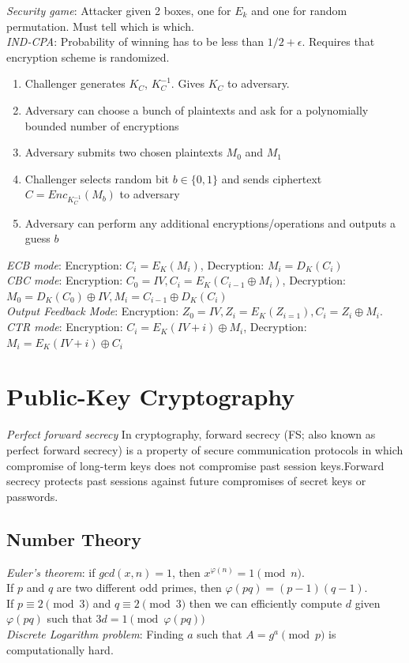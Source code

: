 \documentclass[10pt,landscape]{article}
\newcommand{\totient}{\varphi}
\begin{document}
\begin{multicols}{3}
\textit{Security game}: Attacker given 2 boxes, one for $E_k$ and one for random permutation. Must tell which is which. \\
\textit{IND-CPA}: Probability of winning has to be less than $1/2 + \epsilon$. Requires that encryption scheme is randomized.

\begin{enumerate}
    \item Challenger generates $K_C$, $K_C^{-1}$. Gives $K_C$ to adversary.
    \item Adversary can choose a bunch of plaintexts and ask for a polynomially bounded number of encryptions
    \item Adversary submits two chosen plaintexts $M_0$ and $M_1$
    \item Challenger selects random bit $b\in\{0, 1\}$ and sends ciphertext $C=Enc_{K_C^{-1}}(M_b)$ to adversary
    \item Adversary can perform any additional encryptions/operations and outputs a guess $b$
\end{enumerate}

\textit{ECB mode}: Encryption: $C_i = E_K(M_i)$, Decryption: $M_i = D_K(C_i)$ \\
\textit{CBC mode}: Encryption: $C_0 = IV, C_i = E_K(C_{i-1} \oplus M_i)$, Decryption: $M_0 = D_K(C_0) \oplus IV, M_i = C_{i-1} \oplus D_K(C_i)$ \\
\textit{Output Feedback Mode}: Encryption: $Z_0 = IV, Z_i = E_K(Z_{i=1}), C_i = Z_i \oplus M_i$. \\
\textit{CTR mode}: Encryption: $C_i = E_K(IV + i) \oplus M_i$, Decryption: $M_i = E_K(IV + i) \oplus C_i$

\section{Public-Key Cryptography}

\textit{Perfect forward secrecy} In cryptography, forward secrecy (FS; also known as perfect forward secrecy) is a property of secure communication protocols in which compromise of long-term keys does not compromise past session keys.Forward secrecy protects past sessions against future compromises of secret keys or passwords.

\subsection{Number Theory}

\textit{Euler's theorem}: if $gcd(x, n) = 1$, then $x^{\totient(n)} = 1 \pmod{n}$. \\
If $p$ and $q$ are two different odd primes, then $\totient(pq) = (p-1)(q-1)$. \\
If $p \equiv 2 \pmod{3}$ and $q \equiv 2 \pmod{3}$ then we can efficiently compute $d$ given $\totient(pq)$ such that $3d = 1 \pmod{\totient(pq)}$ \\
\textit{Discrete Logarithm problem}: Finding $a$ such that $A = g^a \pmod{p}$ is computationally hard.


\end{multicols}
\end{document}
